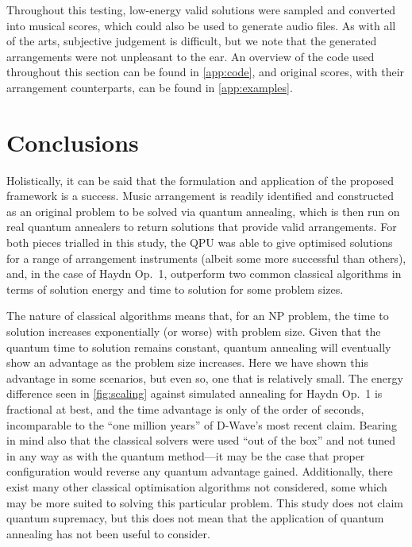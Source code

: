 \documentclass[twocolumn]{article}
\theoremstyle{definition}
\begin{document}
Throughout this testing, low-energy valid solutions were sampled and converted into musical scores, which could also be used to generate audio files. As with all of the arts, subjective judgement is difficult, but we note that the generated arrangements were not unpleasant to the ear.
An overview of the code used throughout this section can be found in \cref{app:code}, and original scores, with their arrangement counterparts, can be found in \cref{app:examples}.

\section{Conclusions}

Holistically, it can be said that the formulation and application of the proposed framework is a success. Music arrangement is readily identified and constructed as an original problem to be solved via quantum annealing, which is then run on real quantum annealers to return solutions that provide valid arrangements. For both pieces trialled in this study, the QPU was able to give optimised solutions for a range of arrangement instruments (albeit some more successful than others), and, in the case of Haydn Op.\ 1, outperform two common classical algorithms in terms of solution energy and time to solution for some problem sizes.

The nature of classical algorithms means that, for an NP problem, the time to solution increases exponentially (or worse) with problem size. Given that the quantum time to solution remains constant, quantum annealing will eventually show an advantage as the problem size increases. Here we have shown this advantage in some scenarios, but even so, one that is relatively small. The energy difference seen in \cref{fig:scaling} against simulated annealing for Haydn Op.\ 1 is fractional at best, and the time advantage is only of the order of seconds, incomparable to the ``one million years'' of D-Wave's most recent claim. Bearing in mind also that the classical solvers were used ``out of the box'' and not tuned in any way as with the quantum method---it may be the case that proper configuration would reverse any quantum advantage gained. Additionally, there exist many other classical optimisation algorithms not considered, some which may be more suited to solving this particular problem. This study does not claim quantum supremacy, but this does not mean that the application of quantum annealing has not been useful to consider.
\end{document}
